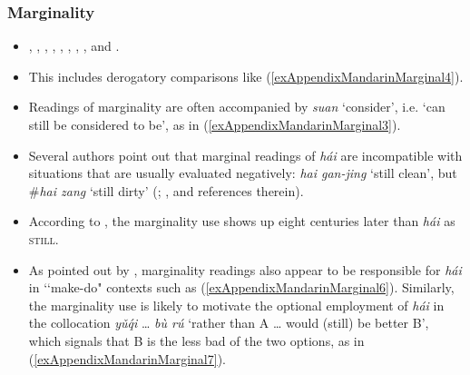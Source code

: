 \subsubsection{Marginality}
\label{appendixMandarinMarginal}
\begin{itemize}
	\item \textcite[ch. 3.2]{Alleton1972}, \textcite[345]{BiqHuang2016}, \textcite[124, 206–207]{Donazzan2008}, \textcite{JingSchmidtGries2009}, \textcite[335]{LiThompson1981}, \textcite{Lu2019}, \textcite{Yang2017}, \textcite{Yeh1998}, \textcite{Zhang2017} and \textcite{ZhangLing2016}.
	\item This includes derogatory comparisons like (\ref{exAppendixMandarinMarginal4}).
	\item Readings of marginality are often accompanied by \textit{suan} \lq consider', i.e. \lq can still be considered to be', as in (\ref{exAppendixMandarinMarginal3}).
	\item Several authors point out that marginal readings of \textit{hái} are incompatible with situations that are usually evaluated negatively: \textit{hai gan-jing} \lq still clean', but \#\textit{hai zang} \lq still dirty' (\cite[264]{Yeh1998}; \cite[56]{Lu2019}, and references therein).
	\item According to \textcite{Yeh1998}, the marginality use shows up eight centuries later than \textit{hái} as \textsc{still}.
	\item As pointed out by \textcite{Paris1988}, marginality readings also appear to be responsible for \textit{hái} in \lq\lq make-do" contexts such as (\ref{exAppendixMandarinMarginal6}). Similarly, the marginality use is likely to motivate the optional employment of \textit{hái} in the collocation \textit{yǔq́i} … \textit{bù rú} \lq rather than A … would (still) be better B', which signals that B is the less bad of the two options, as in (\ref{exAppendixMandarinMarginal7}).
\end{itemize}
\largerpage
